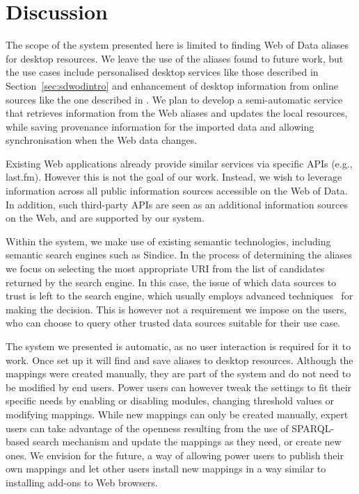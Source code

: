 \section{Discussion}

The scope of the system presented here is limited to finding Web of Data aliases for desktop resources. We leave the use of the aliases found to future work, but the use cases include personalised desktop services like those described in Section~\ref{sec:sdwodintro} and enhancement of desktop information from online sources like the one described in \cite{Groza2009}. We plan to develop a semi-automatic service that retrieves information from the Web aliases and updates the local resources, while saving provenance information for the imported data and allowing synchronisation when the Web data changes.

Existing Web applications already provide similar services via specific APIs (e.g., last.fm). However this is not the goal of our work. Instead, we wish to leverage information across all public information sources accessible on the Web of Data. In addition, such third-party APIs are seen as an additional information sources on the Web, and are supported by our system.

Within the system, we make use of existing semantic technologies, including semantic search engines such as Sindice. In the process of determining the aliases we focus on selecting the most appropriate URI from the list of candidates returned by the search engine. In this case, the issue of which data sources to trust is left to the search engine, which usually employs advanced techniques~\cite{Delbru2010} for making the decision. This is however not a requirement we impose on the users, who can choose to query other trusted data sources suitable for their use case.

The system we presented is automatic, as no user interaction is required for it to work. Once set up it will find and save aliases to desktop resources. 
Although the mappings were created manually, they are part of the system and do not need to be modified by end users. 
Power users can however tweak the settings to fit their specific needs by enabling or disabling modules, changing threshold values or modifying mappings.
While new mappings can only be created manually, expert users can take advantage of the openness resulting from the use of SPARQL-based search mechanism and update the mappings as they need, or create new ones. We envision for the future, a way of allowing power users to publish their own mappings and let other users install new mappings in a way similar to installing add-ons to Web browsers.
